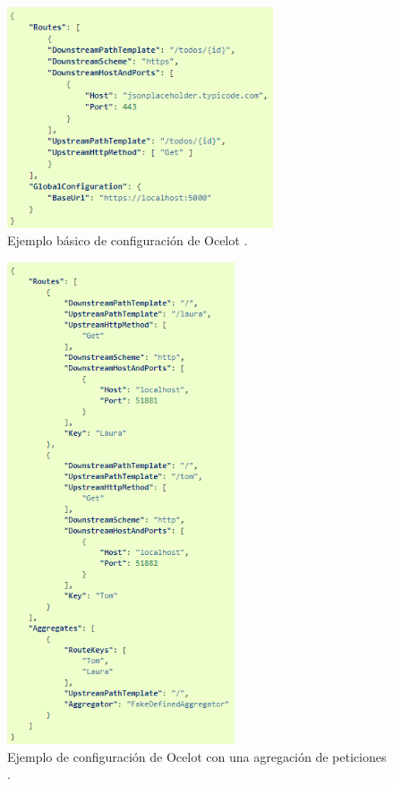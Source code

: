 \documentclass[11pt,spanish,listoffigures]{tfgetsinf}
\begin{document}
\begin{figure}[ht]
\centering
\includegraphics[width=0.7\textwidth]{imagenes/configuracionBasicaOcelot}
\caption[Ejemplo básico de configuración de Ocelot.]{Ejemplo básico de configuración de Ocelot \cite{Ocelot_documentacion}.}
	\label{configuracionBasicaOcelot}
\end{figure}

\begin{figure}[ht]
\centering
\includegraphics[width=0.6\textwidth]{imagenes/configuracionAgregacionOcelot}
\caption[Ejemplo de configuración de Ocelot con una agregación de peticiones.]{Ejemplo de configuración de Ocelot con una agregación de peticiones \cite{Ocelot_documentacion}.}
	\label{configuracionAgregacionOcelot}
\end{figure}
\end{document}

